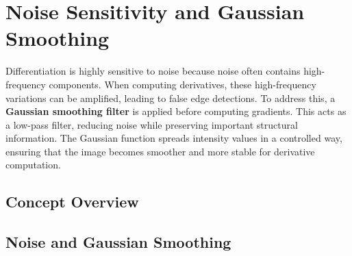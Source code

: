 \documentclass[12pt]{article}
\begin{document}
\section{Noise Sensitivity and Gaussian Smoothing}
Differentiation is highly sensitive to noise because noise often contains high-frequency components. When computing derivatives, these high-frequency variations can be amplified, leading to false edge detections. To address this, a \textbf{Gaussian smoothing filter} is applied before computing gradients. This acts as a low-pass filter, reducing noise while preserving important structural information. The Gaussian function spreads intensity values in a controlled way, ensuring that the image becomes smoother and more stable for derivative computation.


\subsection{Concept Overview}
\subsection{Noise and Gaussian Smoothing}
\end{document}
